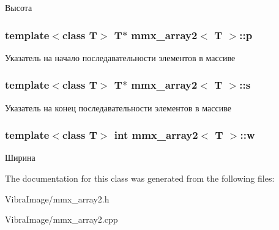 Высота 

\hypertarget{classmmx__array2_af58c57c4dbbe49a06d90d077498f9a3c}{
\subsubsection[{p}]{\setlength{\rightskip}{0pt plus 5cm}template$<$class T$>$ T$\ast$ {\bf mmx\+\_\+array2}$<$ T $>$\+::p}}\label{classmmx__array2_af58c57c4dbbe49a06d90d077498f9a3c}


Указатель на начало последавательности элементов в массиве 

\hypertarget{classmmx__array2_a010e161d462fb8026ed80d00cdbacb57}{
\subsubsection[{s}]{\setlength{\rightskip}{0pt plus 5cm}template$<$class T$>$ T$\ast$ {\bf mmx\+\_\+array2}$<$ T $>$\+::s}}\label{classmmx__array2_a010e161d462fb8026ed80d00cdbacb57}


Указатель на конец последавательности элементов в массиве 

\hypertarget{classmmx__array2_aaa57fdc3151aefd7e9019db52310e222}{
\subsubsection[{w}]{\setlength{\rightskip}{0pt plus 5cm}template$<$class T$>$ int {\bf mmx\+\_\+array2}$<$ T $>$\+::w}}\label{classmmx__array2_aaa57fdc3151aefd7e9019db52310e222}


Ширина 



The documentation for this class was generated from the following files\+:\begin{DoxyCompactItemize}
\item 
Vibra\+Image/mmx\+\_\+array2.\+h\item 
Vibra\+Image/mmx\+\_\+array2.\+cpp\end{DoxyCompactItemize}
